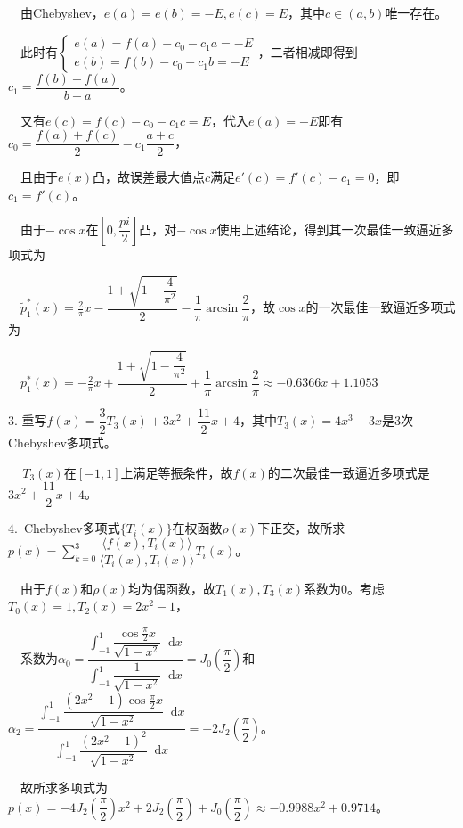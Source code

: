 \documentclass[cn,hazy,green,11pt,normal]{elegantnote}
\newcommand*{\diff}{\mathop{}\!\mathrm{d}}
\begin{document}
    $\quad$由Chebyshev，$e(a)=e(b)=-E,e(c)=E$，其中$c\in(a,b)$唯一存在。

    $\quad$此时有$\begin{cases}e(a)=f(a)-c_0-c_1 a=-E\\e(b)=f(b)-c_0-c_1 b=-E\end{cases}$，二者相减即得到$c_1=\dfrac{f(b)-f(a)}{b-a}$。

    $\quad$又有$e(c)=f(c)-c_0-c_1 c=E$，代入$e(a)=-E$即有$c_0=\dfrac{f(a)+f(c)}{2}-c_1\dfrac{a+c}{2}$，

    $\quad$且由于$e(x)$凸，故误差最大值点$c$满足$e'(c)=f'(c)-c_1=0$，即$c_1=f'(c)$。

    $\quad$由于$-\cos x$在$[0,\dfrac{pi}2]$凸，对$-\cos x$使用上述结论，得到其一次最佳一致逼近多项式为

    $\quad\tilde{p}_1^*(x)=\frac2{\pi}x-\dfrac{1+\sqrt{1-\dfrac{4}{\pi^2}}}2-\dfrac1{\pi}\arcsin \dfrac2{\pi}$，故$\cos x$的一次最佳一致逼近多项式为

    $\quad p_1^*(x)=-\frac2{\pi}x+\dfrac{1+\sqrt{1-\dfrac{4}{\pi^2}}}2+\dfrac1{\pi}\arcsin \dfrac2{\pi}\approx -0.6366x+1.1053$

    $3.\,\,$重写$f(x)=\dfrac32T_3(x)+3x^2+\dfrac{11}2x+4$，其中$T_3(x)=4x^3-3x$是3次Chebyshev多项式。

    $\quad\, T_3(x)$在$[-1,1]$上满足等振条件，故$f(x)$的二次最佳一致逼近多项式是$3x^2+\dfrac{11}2x+4$。

    $4.\,\,\,$Chebyshev多项式$\{T_i(x)\}$在权函数$\rho(x)$下正交，故所求$p(x)=\sum_{k=0}^3 \dfrac{\langle f(x),T_i(x) \rangle}{\langle T_i(x), T_i(x) \rangle}T_i(x)$。

    $\quad$由于$f(x)$和$\rho(x)$均为偶函数，故$T_1(x),T_3(x)$系数为0。考虑$T_0(x)=1,T_2(x)=2x^2-1$，

    $\quad$系数为$\alpha_0=\dfrac{\displaystyle\int_{-1}^1 \dfrac{\cos\tfrac{\pi}2 x}{\sqrt{1-x^2}}\diff x}{\displaystyle\int_{-1}^1 \dfrac1{\sqrt{1-x^2}}\diff x}=J_0\left(\dfrac{\pi}{2}\right)$和$\alpha_2=\dfrac{\displaystyle\int_{-1}^1 \dfrac{(2x^2-1)\cos\tfrac{\pi}2 x}{\sqrt{1-x^2}}\diff x}{\displaystyle\int_{-1}^1 \dfrac{(2x^2-1)^2}{\sqrt{1-x^2}}\diff x}=-2J_2\left(\dfrac{\pi}{2}\right)$。

    $\quad$故所求多项式为$p(x)=-4J_2\left(\dfrac{\pi}{2}\right)x^2+2J_2\left(\dfrac{\pi}{2}\right)+J_0\left(\dfrac{\pi}{2}\right)\approx -0.9988x^2+0.9714$。
\end{document}
